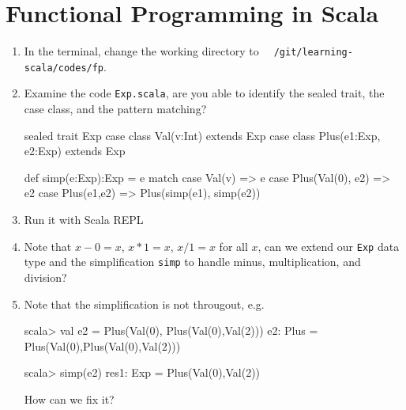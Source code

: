 \documentclass[10pt]{article}
\begin{document}
\section{Functional Programming in Scala}
\begin{enumerate}
\item In the terminal, change the working directory to {\tt
    {}~/git/learning-scala/codes/fp}.
\item Examine the code {\tt Exp.scala}, are you able to identify the
  sealed trait, the case class, and the pattern matching?
\begin{code}
sealed trait Exp
case class Val(v:Int) extends Exp
case class Plus(e1:Exp, e2:Exp) extends Exp

def simp(e:Exp):Exp = e match
{
	case Val(v) => e
	case Plus(Val(0), e2) => e2
	case Plus(e1,e2) => Plus(simp(e1), simp(e2))
}
\end{code}

\item Run it with Scala REPL
\item Note that $x - 0 = x$, $x * 1 = x$, $x / 1 = x$ for all $x$, can
  we extend our {\tt Exp} data type and the simplification {\tt simp} to handle minus, multiplication, and division?
\item Note that the simplification is not througout, e.g. 
\begin{code}
scala> val e2 = Plus(Val(0), Plus(Val(0),Val(2)))
e2: Plus = Plus(Val(0),Plus(Val(0),Val(2)))

scala> simp(e2)
res1: Exp = Plus(Val(0),Val(2))
\end{code}
How can we fix it?
\end{enumerate}
\end{document}
